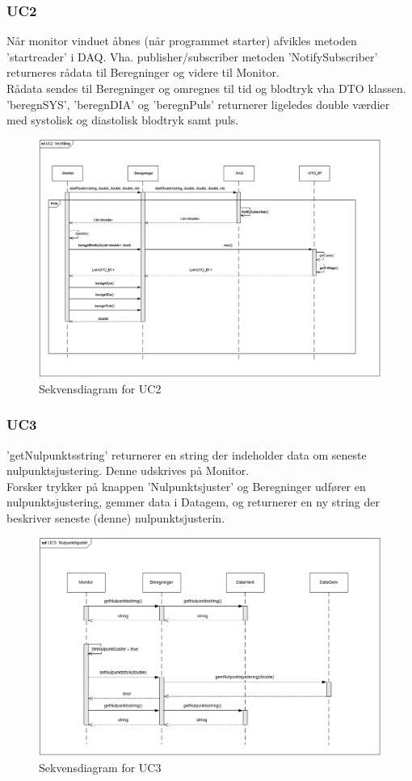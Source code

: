 \subsubsection{UC2}
Når monitor vinduet åbnes (når programmet starter) afvikles metoden 'startreader' i DAQ. Vha. publisher/subscriber metoden 'NotifySubscriber' returneres rådata til Beregninger og videre til Monitor.\\
Rådata sendes til Beregninger og omregnes til tid og blodtryk vha DTO klassen.
'beregnSYS', 'beregnDIA' og 'beregnPuls' returnerer ligeledes double værdier med systolisk og diastolisk blodtryk samt puls.
\begin{figure}[H]
	\centering
	\includegraphics[width=1\textwidth]{Figurer/UC2_SD_SW}
	\caption{Sekvensdiagram for UC2}
\end{figure}

\subsubsection{UC3}
'getNulpunktsstring' returnerer en string der indeholder data om seneste nulpunktsjustering. Denne udskrives på Monitor.\\
Forsker trykker på knappen 'Nulpunktsjuster' og Beregninger udfører en nulpunktsjustering, gemmer data i Datagem, og returnerer en ny string der beskriver seneste (denne) nulpunktsjusterin.

\begin{figure}[H]
	\centering
	\includegraphics[width=1\textwidth]{Figurer/UC3_SD_SW}
	\caption{Sekvensdiagram for UC3}
\end{figure}
